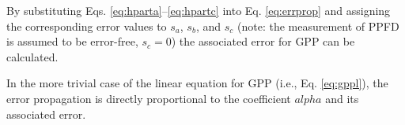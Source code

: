 By substituting Eqs. \ref{eq:hparta}--\ref{eq:hpartc} into Eq. \ref{eq:errprop} and assigning the corresponding error values to $s_{a}$, $s_{b}$, and $s_{c}$ (note: the measurement of PPFD is assumed to be error-free, $s_{c} = 0$) the associated error for GPP can be calculated. 

In the more trivial case of the linear equation for GPP (i.e., Eq. \ref{eq:gppl}), the error propagation is directly proportional to the coefficient $alpha$ and its associated error.
